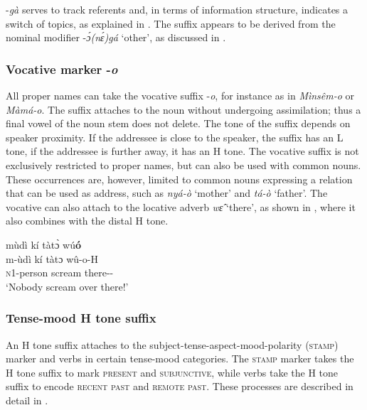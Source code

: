 -{\itshape gà} serves to track referents and, in terms of information structure, indicates a switch of topics, as explained in .
The suffix appears to be derived from the nominal modifier -{\itshape ɔ́(nɛ́)gá} `other', as discussed in . 

\subsubsection{Vocative marker -{\itshape o}}
\label{sec:VOCSuff}

All proper names can take the vocative suffix -{\itshape o}, for instance as in {\itshape Mìnsêm-o} or {\itshape Màmá-o}. The suffix attaches to the noun without undergoing assimilation; thus a final vowel of the noun stem does not delete. The tone of the suffix depends on speaker proximity. If the addressee is close to the speaker, the suffix has an L tone, if the addressee is further away, it has an H tone. 
The vocative suffix is not exclusively restricted to proper names, but can also be used with common nouns. These occurrences are, however, limited to common nouns expressing a relation that can be used as address, such as {\itshape nyá-ò} `mother' and {\itshape tá-ò} `father'.  The vocative can also attach to the locative adverb {\itshape wɛ̂} `there', as shown in , where it also combines with the distal H tone.

\ea \label{VOC}
  \glll mùdì kí tàtɔ̀ wú{\bfseries ó} \\
       m-ùdì kí tàtɔ wû-o-H \\
        \textsc{n}1-person {\NEG} scream there-{\VOC}-{\DIST} \\
    \trans `Nobody scream over there!'
\z

\subsubsection{Tense-mood H tone suffix}
\label{sec:TMHSuff}


An H tone suffix attaches to the subject-tense-aspect-mood-polarity (\textsc{stamp}) mar\-ker and verbs in certain tense-mood categories. The \textsc{stamp} marker takes the H tone suffix to mark \textsc{present} and \textsc{subjunctive}, while verbs take the H tone suffix to encode \textsc{recent past} and \textsc{remote past}.
These processes are described in detail in .






